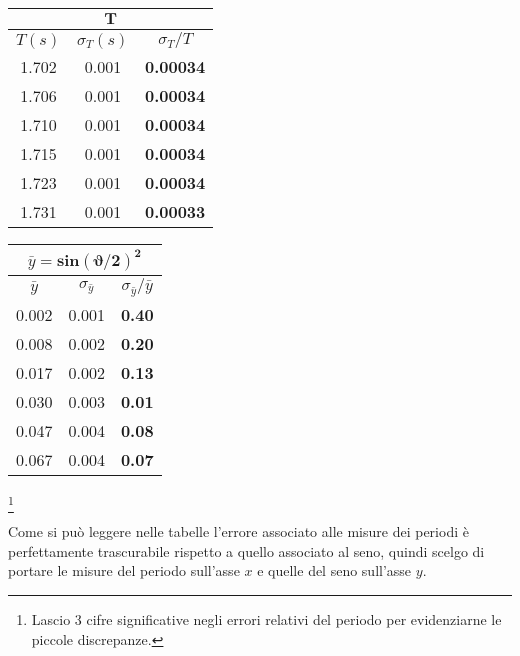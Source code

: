 \documentclass{article}
\begin{document}
	\begin{minipage}{0.5\textwidth}
		\begin{table}[H]
			\centering
			\begin{tabular}{@{}ccc@{}}
				\multicolumn{3}{c}{$\mathbf{T}$} \\ \midrule
				$T(s)$ & $\sigma_T (s)$ & $\sigma_T / T$ \\ \midrule
				1.702 & 0.001 & \textbf{0.00034} \\
				1.706 & 0.001 & \textbf{0.00034} \\
				1.710 & 0.001 & \textbf{0.00034} \\
				1.715 & 0.001 & \textbf{0.00034} \\
				1.723 & 0.001 & \textbf{0.00034} \\
				1.731 & 0.001 & \textbf{0.00033}  \\ \bottomrule   
			\end{tabular}
		\end{table}
	\end{minipage}
	\begin{minipage}{0.5\textwidth}
		\begin{table}[H]
			\centering
			\begin{tabular}{@{}ccc@{}}
				
				\multicolumn{3}{c}{$\bar{y} = \mathbf{sin{\left(\vartheta/2\right)}^2}$} \\ \midrule
				$\bar{y}$ & $\sigma_{\bar{y}}$ & $\sigma_{\bar{y}} / \bar{y}$ \\ \midrule
				0.002&0.001 & \textbf{0.40} \\
				0.008&0.002 & \textbf{0.20}  \\
				0.017&0.002 & \textbf{0.13}  \\ 
				0.030&0.003 & \textbf{0.01}  \\
				0.047&0.004 & \textbf{0.08}  \\
				0.067&0.004 & \textbf{0.07}  \\ \bottomrule  
			\end{tabular}
		\end{table}
	\end{minipage}
	\footnote{Lascio 3 cifre significative negli errori relativi del periodo per evidenziarne le piccole discrepanze.}
	\vspace{1cm}
	
	\noindent
	Come si può leggere nelle tabelle l'errore associato alle misure dei periodi è perfettamente trascurabile rispetto a quello associato al seno, quindi scelgo di portare le misure del periodo sull'asse $x$ e quelle del seno sull'asse $y$. \\
	
\end{document}
